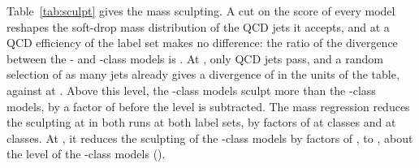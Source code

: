 \documentclass[11pt]{article}
\newcommand{\Kfull}{\VocabSizeLoneeighteight}
\newcommand{\Kres}{\VocabSizeLonesixtwo}
\newcommand{\Kcoarse}{\VocabSizeRonesixQone}
\begin{document}
Table~\ref{tab:sculpt} gives the mass sculpting. A cut on the score of every model reshapes the
soft-drop mass distribution of the QCD jets it accepts, and at a QCD efficiency of
\SculptEffHigh{} the label set makes no difference: the ratio of the divergence between the
\Kcoarse- and \Kfull-class models is \MlstSculptCoarseOverFullTen. At \SculptEffLow{}, only
\MlstSculptNPassOne{} QCD jets pass, and a random selection of as many jets already gives a divergence of
\MlstSculptFloorOne{} in the units of the table, against \MlstSculptFloorTen{} at
\SculptEffHigh. Above this level, the \Kcoarse-class models sculpt more than the \Kfull-class
models, by a factor of \MlstSculptCoarseOverFullOne{} before the level is subtracted. The mass
regression reduces the sculpting at \SculptEffHigh{} in both runs at both label sets, by factors
of \MlstSculptResMassOverResTen{} at \Kres{} classes and \MlstSculptCoarseMassOverCoarseTen{} at
\Kcoarse{} classes. At \SculptEffLow, it reduces the sculpting of the \Kcoarse-class models by
factors of \MlstSculptCoarseMassOverCoarseOne, to \MlstSculptCoarseMassOne, about the level of the
\Kfull-class models (\MlstSculptFullOne).
\end{document}
